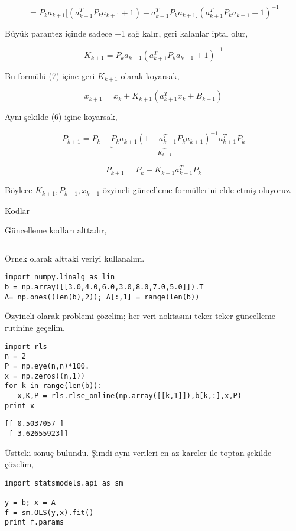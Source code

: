 \documentclass[12pt,fleqn]{article}\usepackage{../../common}
\begin{document}
$$ 
= P_ka_{k+1} 
\big[ (a_{k+1}^T P_k a_{k+1} + 1) -  a_{k+1}^TP_ka_{k+1} \big] (a_{k+1}^T P_k a_{k+1} + 1)^{-1}
$$

Büyük parantez içinde sadece +1 sağ kalır, geri kalanlar iptal olur,

$$ 
K_{k+1} = P_ka_{k+1} (a_{k+1}^T P_k a_{k+1} + 1)^{-1}
$$

Bu formülü (7) içine geri $K_{k+1}$ olarak koyarsak, 

$$ x_{k+1} = x_k + K_{k+1}(a_{k+1}^Tx_k  + B_{k+1})  
$$

Aynı şekilde (6) içine koyarsak,

$$ 
P_{k+1} = P_k - 
\underbrace{P_k a_{k+1}(1 + a_{k+1}^T P_k a_{k+1})^{-1}}_{K_{k+1}}
a_{k+1}^TP_k 
$$

$$ 
P_{k+1} = P_k - K_{k+1}a_{k+1}^TP_k 
$$

Böylece $K_{k+1},P_{k+1},x_{k+1}$ özyineli güncelleme formüllerini elde
etmiş oluyoruz. 

Kodlar

Güncelleme kodları alttadır,

\inputminted[fontsize=\footnotesize]{python}{rls.py}

Örnek olarak alttaki veriyi kullanalım. 

\begin{verbatim}
import numpy.linalg as lin
b = np.array([[3.0,4.0,6.0,3.0,8.0,7.0,5.0]]).T
A= np.ones((len(b),2)); A[:,1] = range(len(b))
\end{verbatim}

Özyineli olarak problemi çözelim; her veri noktasını teker teker güncelleme 
rutinine geçelim. 

\begin{verbatim}
import rls
n = 2
P = np.eye(n,n)*100.
x = np.zeros((n,1))
for k in range(len(b)):
   x,K,P = rls.rlse_online(np.array([[k,1]]),b[k,:],x,P)
print x
\end{verbatim}

\begin{verbatim}
[[ 0.5037057 ]
 [ 3.62655923]]
\end{verbatim}

Üstteki sonuç bulundu. Şimdi aynı verileri en az kareler ile toptan şekilde
çözelim,

\begin{verbatim}
import statsmodels.api as sm

y = b; x = A
f = sm.OLS(y,x).fit()
print f.params
\end{verbatim}
\end{document}
